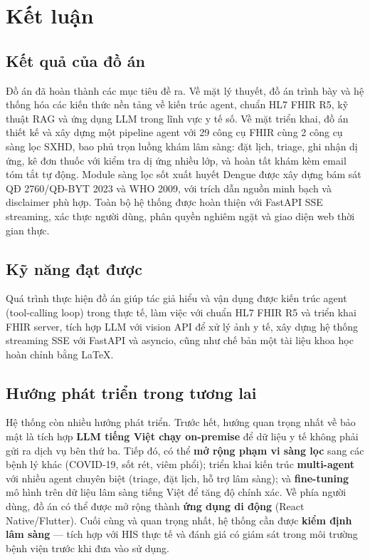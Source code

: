 \documentclass[a4paper,13pt,3p,twoside,openany]{report}
\theoremstyle{definition}
\theoremstyle{remark}
\theoremstyle{definition}
\let\ORIGsection\section
\renewcommand{\section}{\needspace{3\baselineskip}\ORIGsection}
\begin{document}
\chapter*{Kết luận}

\section*{Kết quả của đồ án}

Đồ án đã hoàn thành các mục tiêu đề ra. Về mặt lý thuyết, đồ án trình bày và hệ thống hóa các kiến thức nền tảng về kiến trúc agent, chuẩn HL7 FHIR R5, kỹ thuật RAG và ứng dụng LLM trong lĩnh vực y tế số. Về mặt triển khai, đồ án thiết kế và xây dựng một pipeline agent với 29 công cụ FHIR cùng 2 công cụ sàng lọc SXHD, bao phủ trọn luồng khám lâm sàng: đặt lịch, triage, ghi nhận dị ứng, kê đơn thuốc với kiểm tra dị ứng nhiều lớp, và hoàn tất khám kèm email tóm tắt tự động. Module sàng lọc sốt xuất huyết Dengue được xây dựng bám sát QĐ 2760/QĐ-BYT 2023 và WHO 2009, với trích dẫn nguồn minh bạch và disclaimer phù hợp. Toàn bộ hệ thống được hoàn thiện với FastAPI SSE streaming, xác thực người dùng, phân quyền nghiêm ngặt và giao diện web thời gian thực.

\section*{Kỹ năng đạt được}

Quá trình thực hiện đồ án giúp tác giả hiểu và vận dụng được kiến trúc agent (tool-calling loop) trong thực tế, làm việc với chuẩn HL7 FHIR R5 và triển khai FHIR server, tích hợp LLM với vision API để xử lý ảnh y tế, xây dựng hệ thống streaming SSE với FastAPI và asyncio, cũng như chế bản một tài liệu khoa học hoàn chỉnh bằng \LaTeX.

\section*{Hướng phát triển trong tương lai}

Hệ thống còn nhiều hướng phát triển. Trước hết, hướng quan trọng nhất về bảo mật là tích hợp \textbf{LLM tiếng Việt chạy on-premise} để dữ liệu y tế không phải gửi ra dịch vụ bên thứ ba. Tiếp đó, có thể \textbf{mở rộng phạm vi sàng lọc} sang các bệnh lý khác (COVID-19, sốt rét, viêm phổi); triển khai kiến trúc \textbf{multi-agent} với nhiều agent chuyên biệt (triage, đặt lịch, hỗ trợ lâm sàng); và \textbf{fine-tuning} mô hình trên dữ liệu lâm sàng tiếng Việt để tăng độ chính xác. Về phía người dùng, đồ án có thể được mở rộng thành \textbf{ứng dụng di động} (React Native/Flutter). Cuối cùng và quan trọng nhất, hệ thống cần được \textbf{kiểm định lâm sàng} --- tích hợp với HIS thực tế và đánh giá có giám sát trong môi trường bệnh viện trước khi đưa vào sử dụng.
\end{document}
